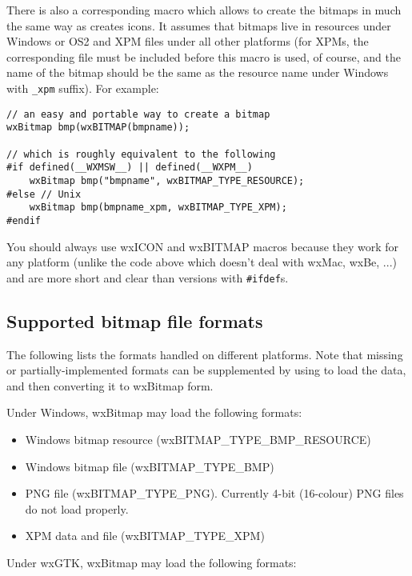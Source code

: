 There is also a corresponding  macro which allows
to create the bitmaps in much the same way as  creates
icons. It assumes that bitmaps live in resources under Windows or OS2 and XPM
files under all other platforms (for XPMs, the corresponding file must be
included before this macro is used, of course, and the name of the bitmap
should be the same as the resource name under Windows with {\tt \_xpm}
suffix). For example:

\begin{verbatim}
// an easy and portable way to create a bitmap
wxBitmap bmp(wxBITMAP(bmpname));

// which is roughly equivalent to the following
#if defined(__WXMSW__) || defined(__WXPM__)
    wxBitmap bmp("bmpname", wxBITMAP_TYPE_RESOURCE);
#else // Unix
    wxBitmap bmp(bmpname_xpm, wxBITMAP_TYPE_XPM);
#endif
\end{verbatim}

You should always use wxICON and wxBITMAP macros because they work for any
platform (unlike the code above which doesn't deal with wxMac, wxBe, ...) and
are more short and clear than versions with {\tt #ifdef}s.

\subsection{Supported bitmap file formats}\label{supportedbitmapformats}

The following lists the formats handled on different platforms. Note
that missing or partially-implemented formats can be supplemented
by using  to load the data, and then converting
it to wxBitmap form.


Under Windows, wxBitmap may load the following formats:

\begin{itemize}\itemsep=0pt
\item Windows bitmap resource (wxBITMAP\_TYPE\_BMP\_RESOURCE)
\item Windows bitmap file (wxBITMAP\_TYPE\_BMP)
\item PNG file (wxBITMAP\_TYPE\_PNG). Currently 4-bit (16-colour) PNG files do not load properly.
\item XPM data and file (wxBITMAP\_TYPE\_XPM)
\end{itemize}

Under wxGTK, wxBitmap may load the following formats:

